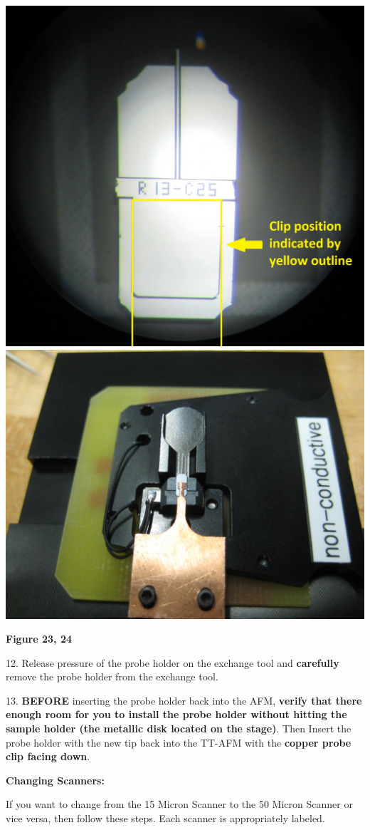 \documentclass{../lab}
\begin{document}
\noindent
\href{http://experimentationlab.berkeley.edu/sites/default/files/AFMImages/23.JPG}{\includegraphics[width=0.33\linewidth,keepaspectratio]{images/23.JPG}}
\href{http://experimentationlab.berkeley.edu/sites/default/files/IMG_4053.JPG}{\includegraphics[width=0.33\linewidth,keepaspectratio]{images/IMG_4053.JPG}}

\textbf{Figure 23, 24}

12.  Release pressure of the probe holder on the exchange tool and \textbf{carefully} remove the probe holder from the exchange tool.

13. \textbf{BEFORE} inserting the probe holder back into the AFM, \textbf{verify that there enough room for you to install the probe holder without hitting the sample holder (the metallic disk located on the stage)}.  Then Insert the probe holder with the new tip back into the TT-AFM with the \textbf{copper probe clip facing down}.

\textbf{Changing Scanners:}

If you want to change from the 15 Micron Scanner to the 50 Micron Scanner or vice versa, then follow these steps. Each scanner is appropriately labeled.
\end{document}
